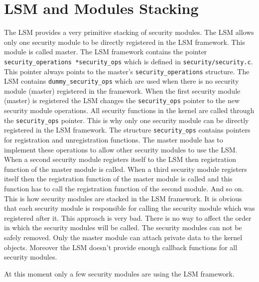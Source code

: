 \section{LSM and Modules Stacking}
The LSM provides a very primitive stacking of security modules. The LSM allows only one security
module to be directly registered in the LSM framework. This module is called master.
The LSM framework contains the pointer \texttt{security\_operations *security\_ops} which is
defined in \texttt{security/security.c}. This pointer always points to the master's
\texttt{security\_operations} structure. The LSM contains \texttt{dummy\_security\_ops}
which are used when there is no security module (master) registered in the framework. When
the first security module (master) is registered the LSM changes the \texttt{security\_ops} pointer to
the new security module operations. All security functions in the kernel are
called through the 
\texttt{security\_ops} pointer. This is why only one security module can be directly registered
in the LSM framework. The structure \texttt{security\_ops} contains pointers for registration
and unregistration functions. The master module has to implement these operations to allow other
security modules to use the LSM. When a second security module registers itself to the LSM
then registration function of the master module is called. When a third security module
registers itself then the registration function of the master module is called and this
function has to call the registration function of the second module. And so on. This is how
security modules are stacked in the LSM framework. It is obvious that each security module
is responsible for calling the security module which was registered after it. This
approach is very bad. There is no way to affect the order in which the security
modules will be called. The security modules can not be safely removed. Only the master module can
attach private data to the kernel objects. Moreover the LSM doesn't provide enough
callback functions for all security modules.

At this moment only a few security modules are using the LSM framework. 

